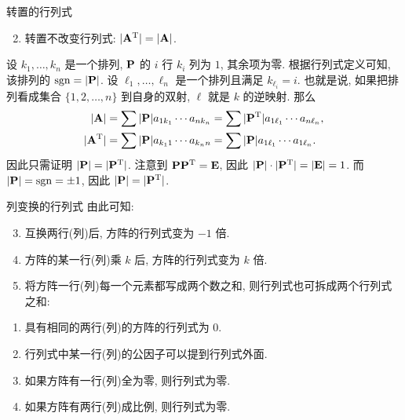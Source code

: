 \begin{frame}{转置的行列式}
	\onslide<+->
	\begin{alertblock@}
		\begin{enumerate}
			\setcounter{enumi}{1}
			\item 转置不改变行列式: $|{\mathbf{A}}^{\mathrm{T}}|=|{\mathbf{A}}|$.
		\end{enumerate}
	\end{alertblock@}
	\onslide<+->
	设 $k_1,\dots,k_n$ 是一个排列, ${\mathbf{P}}$ 的 $i$ 行 $k_i$ 列为 $1$, 其余项为零.
	\onslide<+->
	根据行列式定义可知, 该排列的 $\operatorname{sgn}=|{\mathbf{P}}|$.
	\onslide<+->
	设 $\ell_1,\dots,\ell_n$ 是一个排列且满足 $k_{\ell_i}=i$.
	\onslide<+->
	也就是说, 如果把排列看成集合 $\{1,2,\dots,n\}$ 到自身的双射, $\ell$ 就是 $k$ 的逆映射.
	\onslide<+->
	那么
	\begin{align*}
		|{\mathbf{A}}|&=\sum|{\mathbf{P}}| a_{1k_1}\cdots a_{nk_n}=\sum|{\mathbf{P}}^{\mathrm{T}}| a_{1\ell_1}\cdots a_{n\ell_n},\\
		|{\mathbf{A}}^{\mathrm{T}}|&=\sum|{\mathbf{P}}| a_{k_1 1}\cdots a_{k_n n}=\sum|{\mathbf{P}}| a_{1\ell_1}\cdots a_{1 \ell_n}.
	\end{align*}
	\onslide<+->
	因此只需证明 $|{\mathbf{P}}|=|{\mathbf{P}}^{\mathrm{T}}|$.
	\onslide<+->
	注意到 ${\mathbf{P}}{\mathbf{P}}^{\mathrm{T}}={\mathbf{E}}$, 因此 $|{\mathbf{P}}|\cdot|{\mathbf{P}}^{\mathrm{T}}|=|{\mathbf{E}}|=1$.
	\onslide<+->
	而 $|{\mathbf{P}}|=\operatorname{sgn}=\pm1$, 因此 $|{\mathbf{P}}|=|{\mathbf{P}}^{\mathrm{T}}|$.
\end{frame}


\begin{frame}{列变换的行列式}
	\onslide<+->
	由此可知:
	\onslide<+->
	\begin{alertblock@}
		\begin{enumerate}
			\setcounter{enumi}{2}
			\item 互换两行(列)后, 方阵的行列式变为 $-1$ 倍.
			\item 方阵的某一行(列)乘 $k$ 后, 方阵的行列式变为 $k$ 倍.
			\item 将方阵一行(列)每一个元素都写成两个数之和, 则行列式也可拆成两个行列式之和:
		\end{enumerate}
	\end{alertblock@}
	\onslide<+->
	\begin{corollary}
		\begin{enumerate}
			\item 具有相同的两行(列)的方阵的行列式为 $0$.
			\item 行列式中某一行(列)的公因子可以提到行列式外面.
			\item 如果方阵有一行(列)全为零, 则行列式为零.
			\item 如果方阵有两行(列)成比例, 则行列式为零.
		\end{enumerate}
	\end{corollary}
\end{frame}


